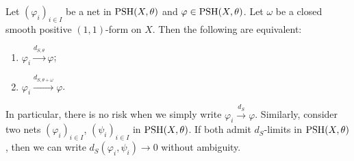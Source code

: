 \begin{corollary}\label{cor:dSconv_changetheta}
    Let $(\varphi_i)_{i\in I}$ be a net in $\mathrm{PSH}(X,\theta)$ and $\varphi\in \mathrm{PSH}(X,\theta)$. Let $\omega$ be a closed smooth positive $(1,1)$-form on $X$. Then the following are equivalent:
    \begin{enumerate}
        \item\label{itm:cor:dSconv_changetheta:1} $\varphi_i\xrightarrow{d_{S,\theta}}\varphi$;
        \item\label{itm:cor:dSconv_changetheta:2} $\varphi_i\xrightarrow{d_{S,\theta+\omega}}\varphi$.
    \end{enumerate}
\end{corollary}
In particular, there is no risk when we simply write $\varphi_i\xrightarrow{d_S}\varphi$. Similarly, consider two nets $(\varphi_i)_{i\in I}$, $(\psi_i)_{i\in I}$ in $\mathrm{PSH}(X,\theta)$. If both admit $d_S$-limits in $\mathrm{PSH}(X,\theta)$, then we can write $d_S(\varphi_i,\psi_i)\to 0$ without ambiguity.

